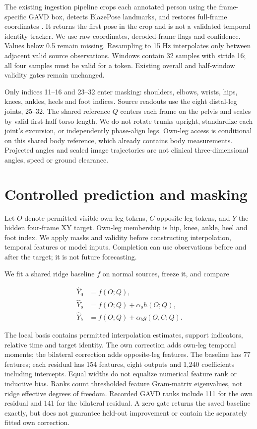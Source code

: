 \documentclass[letterpaper]{article}
\begin{document}
The existing ingestion pipeline crops each annotated person using the frame-specific GAVD box, detects BlazePose landmarks, and restores full-frame coordinates \citep{bazarevsky2020blazepose}. It returns the first pose in the crop and is not a validated temporal identity tracker. We use raw coordinates, decoded-frame flags and confidence. Values below 0.5 remain missing. Resampling to 15 Hz interpolates only between adjacent valid source observations. Windows contain 32 samples with stride 16; all four samples must be valid for a token. Existing overall and half-window validity gates remain unchanged.

Only indices 11--16 and 23--32 enter masking: shoulders, elbows, wrists, hips, knees, ankles, heels and foot indices. Source readouts use the eight distal-leg joints, 25--32. The shared reference \(Q\) centers each frame on the pelvis and scales by valid first-half torso length. We do not rotate trunks upright, standardize each joint's excursion, or independently phase-align legs. Own-leg access is conditional on this shared body reference, which already contains body measurements. Projected angles and scaled image trajectories are not clinical three-dimensional angles, speed or ground clearance.

\section{Controlled prediction and masking}

Let \(O\) denote permitted visible own-leg tokens, \(C\) opposite-leg tokens, and \(Y\) the hidden four-frame XY target. Own-leg membership is hip, knee, ankle, heel and foot index. We apply masks and validity before constructing interpolation, temporal features or model inputs. Completion can use observations before and after the target; it is not future forecasting.

We fit a shared ridge baseline \(f\) on normal sources, freeze it, and compare

\begin{align}
\widehat Y_0 &= f(O;Q),\\
\widehat Y_o &= f(O;Q)+\alpha_o h(O;Q),\\
\widehat Y_b &= f(O;Q)+\alpha_b g(O,C;Q).
\end{align}

The local basis contains permitted interpolation estimates, support indicators, relative time and target identity. The own correction adds own-leg temporal moments; the bilateral correction adds opposite-leg features. The baseline has 77 features; each residual has 154 features, eight outputs and 1,240 coefficients including intercepts. Equal widths do not equalize numerical feature rank or inductive bias. Ranks count thresholded feature Gram-matrix eigenvalues, not ridge effective degrees of freedom. Recorded GAVD ranks include 111 for the own residual and 141 for the bilateral residual. A zero gate returns the saved baseline exactly, but does not guarantee held-out improvement or contain the separately fitted own correction.
\end{document}
